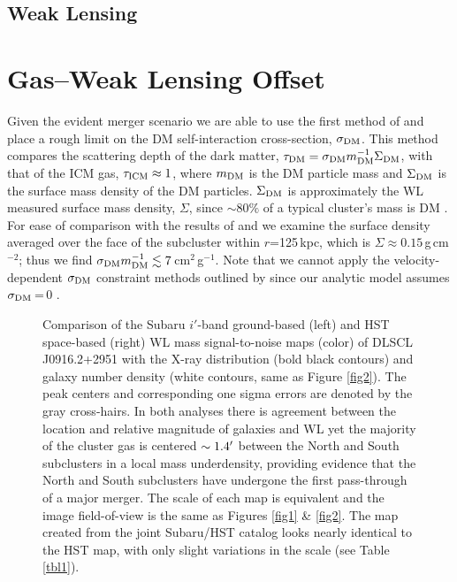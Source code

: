 \subsection{Weak Lensing}


\section{Gas--Weak Lensing Offset}

Given the evident merger scenario we are able to use the first method of \citet{Markevitch:2004dl} and place a rough limit on the DM self-interaction cross-section, $\sigma_{\rm DM}$.
This method compares the scattering depth of the dark matter, $\tau_{\rm DM}=\sigma_{\rm DM}m^{-1}_{\rm DM} \Sigma_{\rm DM}$, with that of the ICM gas, $\tau_{\rm ICM}\approx 1$, where $m_{\rm DM}$ is the DM particle mass and $\Sigma_{\rm DM}$ is the surface mass density of the DM particles.
$\Sigma_{\rm DM}$ is approximately the WL measured surface mass density, $\Sigma$, since $\sim80\%$ of a typical cluster's mass is DM \citep{Diaferio:2008js}.
For ease of comparison with the results of \citet{Markevitch:2004dl} and \citet{Merten:2011gu} we examine the surface density averaged over the face of the subcluster within $r$=125\,kpc, which is $\Sigma\approx0.15$\,g\,cm$^{-2}$; thus we find $\sigma_{\rm DM} m_{\rm DM}^{-1} \lesssim 7$\,cm$^2$\,g$^{-1}$.  
Note that we cannot apply the velocity-dependent $\sigma_{\rm DM}$ constraint methods outlined by \citet{Markevitch:2004dl} since our analytic model assumes $\sigma_{\rm DM}$\,=\,0 \citep{Dawson:2012dl, Dawson:2012ub}.

\begin{figure}
\caption[Comparison of the Subaru $i'$-band ground-based and HST space-based WL mass signal-to-noise maps of DLSCL J0916.2+2951 with the X-ray distribution and galaxy number density.]{Comparison of the Subaru $i'$-band ground-based (left) and HST space-based (right) WL mass signal-to-noise maps (color) of DLSCL J0916.2+2951 with the X-ray distribution (bold black contours) and galaxy number density (white contours, same as Figure \ref{fig2}). The peak centers and corresponding one sigma errors are denoted by the gray cross-hairs.
In both analyses there is agreement between the location and relative magnitude of galaxies and WL yet the majority of the cluster gas is centered $\sim1.4\mbox{$^\prime$}$ between the North and South subclusters in a local mass underdensity, providing evidence that the North and South subclusters have undergone the first pass-through of a major merger.
The scale of each map is equivalent and the image field-of-view is the same as Figures \ref{fig1} \& \ref{fig2}.
The map created from the joint Subaru/HST catalog looks nearly identical to the HST map, with only slight variations in the scale (see Table \ref{tbl1}).
\label{fig3}}
\end{figure}

